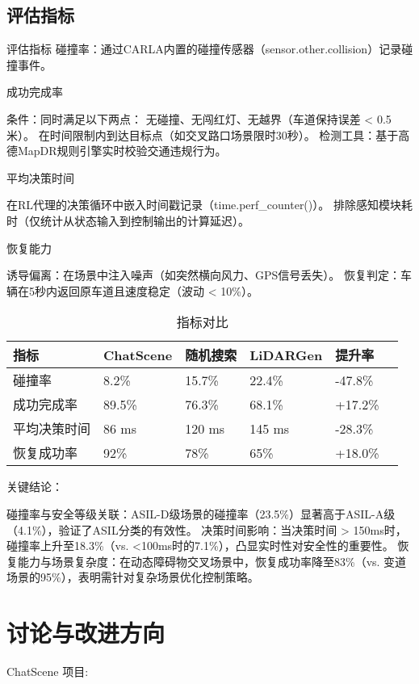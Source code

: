 \subsection{评估指标}

评估指标
碰撞率：通过CARLA内置的碰撞传感器（sensor.other.collision）记录碰撞事件。

成功完成率

条件：同时满足以下两点：
无碰撞、无闯红灯、无越界（车道保持误差 < 0.5米）。
在时间限制内到达目标点（如交叉路口场景限时30秒）。
检测工具：基于高德MapDR规则引擎实时校验交通违规行为。

平均决策时间

在RL代理的决策循环中嵌入时间戳记录（time.perf\_counter()）。
排除感知模块耗时（仅统计从状态输入到控制输出的计算延迟）。

恢复能力

诱导偏离：在场景中注入噪声（如突然横向风力、GPS信号丢失）。
恢复判定：车辆在5秒内返回原车道且速度稳定（波动 < 10\%）。


\begin{table}[htb]
	\centering
	\caption{指标对比}
	\label{T.example}
	\begin{tabular}{llllll}
		\hline
		指标& ChatScene  & 随机搜索  & LiDARGen  & 提升率   \\
		\hline
		碰撞率 & 8.2\%  & 15.7\% & 22.4\% 	&  -47.8\%	\\
		\hline
		成功完成率 & 89.5\% & 76.3\% & 68.1\% 	& 	 +17.2\%	\\
		\hline
		平均决策时间 & 86 ms & 120 ms & 145 ms&	-28.3\%	\\
		\hline
		恢复成功率 & 92\% & 78\% & 65\%	&  +18.0\%	\\
		
		\hline
	\end{tabular}
\end{table}


关键结论：


碰撞率与安全等级关联：ASIL-D级场景的碰撞率（23.5\%）显著高于ASIL-A级（4.1\%），验证了ASIL分类的有效性。
决策时间影响：当决策时间 > 150ms时，碰撞率上升至18.3\%（vs. <100ms时的7.1\%），凸显实时性对安全性的重要性。
恢复能力与场景复杂度：在动态障碍物交叉场景中，恢复成功率降至83\%（vs. 变道场景的95\%），表明需针对复杂场景优化控制策略。



\section{讨论与改进方向}
ChatScene 项目:


